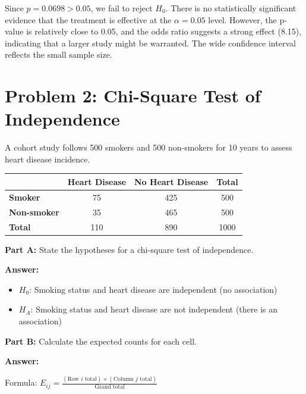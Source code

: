 \documentclass[11pt]{article}
\begin{document}
Since $p = 0.0698 > 0.05$, we fail to reject $H_0$. There is no statistically significant evidence that the treatment is effective at the $\alpha = 0.05$ level. However, the p-value is relatively close to 0.05, and the odds ratio suggests a strong effect (8.15), indicating that a larger study might be warranted. The wide confidence interval reflects the small sample size.

\newpage

\section{Problem 2: Chi-Square Test of Independence}

A cohort study follows 500 smokers and 500 non-smokers for 10 years to assess heart disease incidence.

\begin{center}
\begin{tabular}{l|cc|c}
& \textbf{Heart Disease} & \textbf{No Heart Disease} & \textbf{Total} \\
\hline
\textbf{Smoker} & 75 & 425 & 500 \\
\textbf{Non-smoker} & 35 & 465 & 500 \\
\hline
\textbf{Total} & 110 & 890 & 1000 \\
\end{tabular}
\end{center}

\vspace{6pt}

\textbf{Part A:} State the hypotheses for a chi-square test of independence.

\vspace{0.3cm}

\textbf{Answer:}
\begin{itemize}
\item $H_0$: Smoking status and heart disease are independent (no association)
\item $H_A$: Smoking status and heart disease are not independent (there is an association)
\end{itemize}

\vspace{0.5cm}

\textbf{Part B:} Calculate the expected counts for each cell.

\vspace{0.3cm}

\textbf{Answer:}

Formula: $E_{ij} = \frac{(\text{Row } i \text{ total}) \times (\text{Column } j \text{ total})}{\text{Grand total}}$
\end{document}
